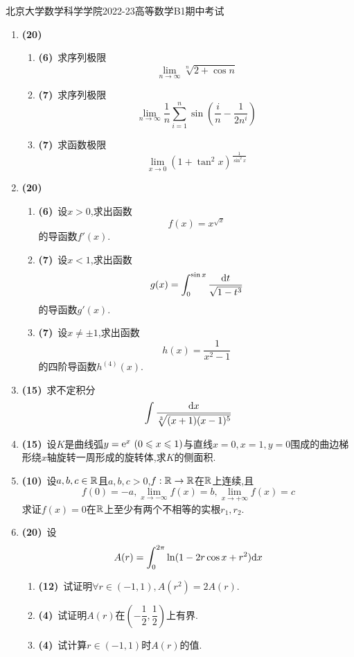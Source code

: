 \documentclass{ctexart}
\begin{document}
\pagestyle{empty}
\begin{center}\Large
    北京大学数学科学学院2022-23高等数学B1期中考试
\end{center}
\begin{enumerate}[leftmargin=*,label=\textbf{\arabic*.},topsep=0pt,parsep=0pt,itemsep=0pt,partopsep=0pt]
    \item \textbf{(20)}\ \begin{enumerate}[label=\textbf{(\arabic*)},leftmargin=*]
        \item \textbf{(6)}\ 求序列极限$$\lim_{n\to\infty}{\sqrt[n]{2+\cos n}}$$
        \item \textbf{(7)}\ 求序列极限$$\lim_{n\to\infty}{\dfrac{1}{n}\sum_{i=1}^{n}{\sin\left(\dfrac{i}{n}-\dfrac{1}{2n^i}\right)}}$$
        \item \textbf{(7)}\ 求函数极限$$\lim_{x\to0}{\left(1+\tan^2 x\right)^{\frac{1}{\sin^2 x}}}$$
    \end{enumerate}

    \item \textbf{(20)}\ \begin{enumerate}[label=\textbf{(\arabic*)},leftmargin=*]
        \item \textbf{(6)}\ 设$x>0$,求出函数$$f(x)=x^{\sqrt{x}}$$的导函数$f'(x)$.
        \item \textbf{(7)}\ 设$x<1$,求出函数$$g(x)=\int_0^{\sin x}\dfrac{\mathrm{d} t}{\sqrt{1-t^3}}$$的导函数$g'(x)$.
        \item \textbf{(7)}\ 设$x\neq\pm 1$,求出函数$$h(x)=\dfrac{1}{x^2-1}$$的四阶导函数$h^{(4)}(x)$.
    \end{enumerate}

    \item \textbf{(15)}\ 求不定积分$$\int{\dfrac{\mathrm{d}x}{\sqrt[3]{(x+1)(x-1)^5}}}$$

    \item \textbf{(15)}\ 设$K$是曲线弧$y=\mathrm{e}^x\ (0\leqslant x\leqslant 1)$与直线$x=0,x=1,y=0$围成的曲边梯形绕$x$轴旋转一周形成的旋转体,求$K$的侧面积.

    \item \textbf{(10)}\ 设$a,b,c\in\mathbb{R}$且$a,b,c>0$,$f:\mathbb{R}\to\mathbb{R}$在$\mathbb{R}$上连续,且$$f(0)=-a,\lim_{x\to-\infty}f(x)=b,\lim_{x\to+\infty}f(x)=c$$求证$f(x)=0$在$\mathbb{R}$上至少有两个不相等的实根$r_1,r_2$.

    \item \textbf{(20)}\ 设$$A(r)=\int_0^{2\pi}\ln(1-2r\cos x+r^2)\mathrm{d} x$$
    \begin{enumerate}[label=\textbf{(\arabic*)},leftmargin=*]
        \item \textbf{(12)}\ 试证明$\displaystyle\forall r\in(-1,1),A(r^2)=2A(r)$.
        \item \textbf{(4)}\ 试证明$A(r)$在$\left(-\dfrac{1}{2},\dfrac{1}{2}\right)$上有界.
        \item \textbf{(4)}\ 试计算$r\in(-1,1)$时$A(r)$的值.
    \end{enumerate}
\end{enumerate}
\end{document}
